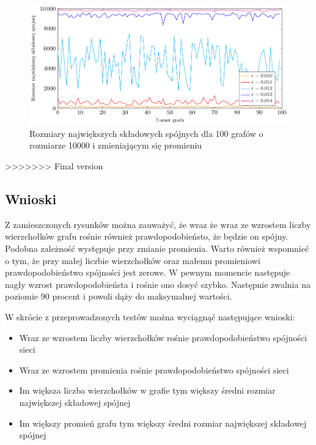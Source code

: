 		\begin{figure}
			\centering
			\includegraphics[scale=0.8]{10000-max_comps_sizes.pdf}
			\caption{Rozmiary największych składowych spójnych dla 100 grafów o rozmiarze 10000 i zmieniającym się promieniu}
			\label{10000-max_comps_sizes}
		\end{figure}
>>>>>>> Final version

	\subsection{Wnioski}
		\label{final:testy:wnioski}

		Z zamieszczonych rysunków można zauważyć, że wraz że wraz ze wzrostem liczby wierzchołków grafu rośnie również prawdopodobieństo, że będzie on spójny. Podobna zależność występuje przy zmianie promienia. Warto również wspomnieć o tym, że przy małej liczbie wierzchołków oraz małemu promieniowi prawdopodobieństwo spójności jest zerowe. W pewnym momencie następuje nagły wzrost prawdopodobieństa i rośnie ono dosyć szybko. Następnie zwalnia na poziomie 90 procent i powoli dąży do maksymalnej wartości.

		W skrócie z przeprowadzonych testów można wyciągnąć następujące wnioski:
		\begin{itemize}
			\item Wraz ze wzrostem liczby wierzchołków rośnie prawdopodobieństwo spójności sieci
			\item Wraz ze wzrostem promienia rośnie prawdopodobieństwo spójności sieci
			\item Im większa liczba wierzchołków w grafie tym większy średni rozmiar największej składowej spójnej
			\item Im większy promień grafu tym większy średni rozmiar największej składowej spójnej
		\end{itemize}
